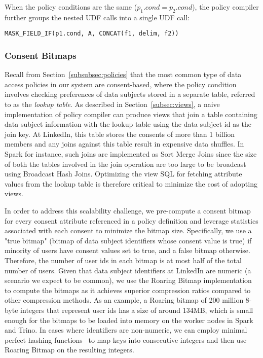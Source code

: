When the policy conditions are the same ($p_1.cond = p_2.cond$), the policy compiler further groups the nested UDF calls into a single UDF call:
\begin{lstlisting} 
MASK_FIELD_IF(p1.cond, A, CONCAT(f1, delim, f2))
\end{lstlisting}

\subsubsection{Consent Bitmaps} \label{subsubsec:bitmap}
Recall from Section~\ref{subsubsec:policies} that the most common type of data access policies in our system are consent-based, where the policy condition involves checking preferences of data subjects stored in a separate table, referred to as the {\em lookup table}. As described in Section~\ref{subsec:views}, a naive implementation of policy compiler can produce views that join a table containing data subject information with the lookup table using the data subject id as the join key. At LinkedIn, this table stores the consents of more than 1 billion members and any joins against this table result in expensive data shuffles. In Spark for instance, such joins are implemented as Sort Merge Joins since the size of both the tables involved in the join operation are too large to be broadcast using Broadcast Hash Joins. Optimizing the view SQL for fetching attribute values from the lookup table is therefore critical to minimize the cost of adopting views.

In order to address this scalability challenge, we pre-compute a consent bitmap for every consent attribute referenced in a policy definition and leverage statistics associated with each consent to minimize the bitmap size. Specifically, we use a "true bitmap" (bitmap of data subject identifiers whose consent value is true) if minority of users have consent values set to true, and a false bitmap otherwise. Therefore, the number of user ids in each bitmap is at most half of the total number of users. Given that data subject identifiers at LinkedIn are numeric (a scenario we expect to be common), we use the Roaring Bitmap implementation~ \cite{Lemire16} to compute the bitmaps as it achieves superior compression ratios compared to other compression methods. As an example, a Roaring bitmap of 200 million 8-byte integers that represent user ids has a size of around 134MB, which is small enough for the bitmaps to be loaded into memory on the worker nodes in Spark and Trino. In cases where identifiers are non-numeric, we can employ minimal perfect hashing functions~\cite{Belazzougui09} to map keys into consecutive integers and then use Roaring Bitmap on the resulting integers.

